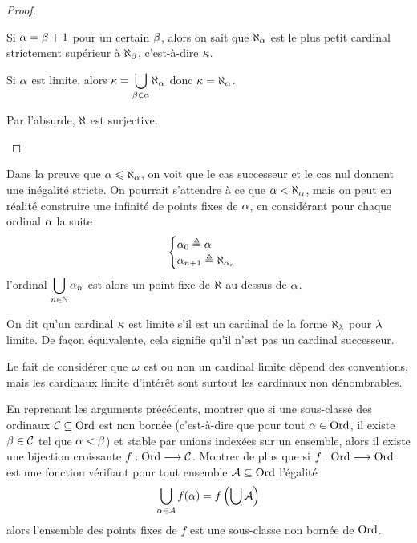 \begin{proof}
\begin{enumerate}[label=(\roman*)]
    Si $\alpha = \beta + 1$ pour un certain $\beta$, alors on sait que
    $\aleph_{\alpha}$ est le plus petit cardinal strictement supérieur à
    $\aleph_\beta$, c'est-à-dire $\kappa$.
    
    Si $\alpha$ est limite, alors
    $\displaystyle\kappa = \bigcup_{\beta \in \alpha} \aleph_\alpha$
    donc $\kappa = \aleph_\alpha$.

    Par l'absurde, $\aleph$ est surjective.\qedhere
  \end{enumerate}
\end{proof}

\begin{remark}
  Dans la preuve que $\alpha \leqslant \aleph_\alpha$, on voit que le cas successeur
  et le cas nul donnent une inégalité stricte. On pourrait s'attendre à ce que
  $\alpha < \aleph_\alpha$, mais on peut en réalité construire une infinité de
  points fixes de $\alpha$, en considérant pour chaque ordinal $\alpha$ la suite
  \[\begin{cases}
  \alpha_0 \triangleq \alpha \\
  \alpha_{n+1} \triangleq \aleph_{\alpha_n}
  \end{cases}\]
  l'ordinal $\displaystyle\bigcup_{n \in \mathbb N} \alpha_n$ est alors un point fixe de
  $\aleph$ au-dessus de $\alpha$.
\end{remark}

\begin{definition}
  On dit qu'un cardinal $\kappa$ est limite s'il est un cardinal de la forme
  $\aleph_{\lambda}$ pour $\lambda$ limite. De façon équivalente, cela signifie
  qu'il n'est pas un cardinal successeur.
\end{definition}

\begin{remark}
  Le fait de considérer que $\omega$ est ou non un cardinal limite dépend des
  conventions, mais les cardinaux limite d'intérêt sont surtout les cardinaux
  non dénombrables.
\end{remark}

\begin{exercise}
  En reprenant les arguments précédents, montrer que si une sous-classe des
  ordinaux $\mathcal{C}\subseteq\operatorname{Ord}$ est non bornée (c'est-à-dire que pour tout
  $\alpha \in \operatorname{Ord}$, il existe $\beta \in \mathcal{C}$ tel que $\alpha < \beta$)
  et stable par unions indexées sur un ensemble,
  alors il existe une bijection croissante $f : \displaystyle \operatorname{Ord} \longrightarrow \mathcal{C}$.
  Montrer de plus que si $f : \displaystyle \operatorname{Ord} \longrightarrow \operatorname{Ord}$ est une fonction
  vérifiant pour tout ensemble $\mathcal A\subseteq \operatorname{Ord}$ l'égalité
  \[\bigcup_{\alpha \in \mathcal A} f(\alpha) = f\left(\bigcup \mathcal A\right)\]
  alors l'ensemble des points fixes de $f$ est une sous-classe non bornée de
  $\operatorname{Ord}$.
\end{exercise}

